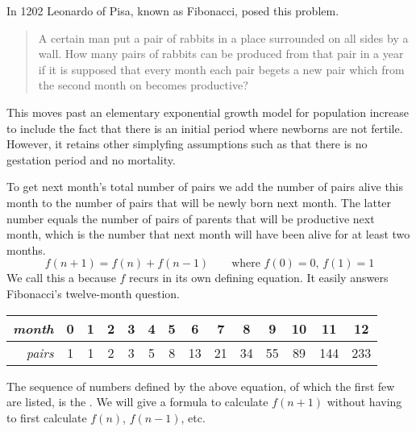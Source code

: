 
In 1202 Leonardo of Pisa, known as Fibonacci, posed this problem.
\begin{quotation}
  A certain man put a pair of rabbits in a place surrounded on all sides by a 
  wall.
  How many pairs of rabbits can be produced from that pair in a year if it
  is supposed that every month each pair begets a new pair which from the 
  second month on becomes productive? 
\end{quotation}
This moves past an elementary exponential growth model for
population increase
to include the fact that there is an initial period where 
newborns are not fertile.
However, it retains other simplyfing assumptions such as  
that there is no gestation period and no mortality.

To get next month's total number of pairs 
we add the number of pairs alive this month to
the number of pairs that will be newly born next month.
The latter number equals the number of pairs of parents that will be 
productive next month, which is the number that next month will 
have been alive for at least two months.
\begin{equation*}
  f(n+1)=f(n)+f(n-1)  \qquad \text{where $f(0)=0$, $f(1)=1$}
\end{equation*}
We call this a 
because $f$ recurs in its own defining equation.
It easily answers Fibonacci's twelve-month question.
\begin{center}
  \begin{tabular}{r|ccccccccccccc}
    \textit{month}
     &0  &1  &2  &3  &4  &5  &6  &7  &8  &9  &10  &11  &12  \\ \hline
    \textit{pairs}
     &1  &1  &2  &3  &5  &8  &13  &21  &34  &55  &89  &144  &233  
  \end{tabular}
\end{center}
The sequence of numbers defined by the above equation, of which the first few
are listed, is the 
.
We will give a formula to
calculate $f(n+1)$ without having to first calculate $f(n)$, $f(n-1)$, etc.

